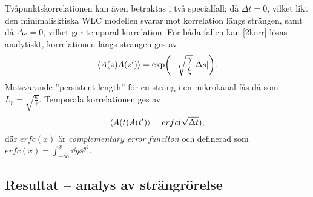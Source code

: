 Tvåpunktskorrelationen kan även betraktas i två specialfall; då $\Delta t=0$, vilket likt den minimalisktiska WLC modellen svarar mot korrelation längs strängen, samt då $\Delta s=0$, vilket ger temporal korrelation. För båda fallen kan \eqref{2korr} lösas analytiskt, korrelationen längs strängen ges av
\begin{equation}
\ev{A(z)A(z')}=\exp(-\sqrt{\frac{\gamma}{\xi}}\abs{\Delta s}).
\end{equation}
Motsvarande ''persistent length'' för en sträng i en mikrokanal fås då som $L_{p}=\sqrt{\frac{\kappa}{\gamma}}$.
Temporala korrelationen ges av
\begin{equation}
    \ev{A(t)A(t')}=erfc(\sqrt{\Delta t}),
\end{equation}
där $erfc(x)$ är \emph{complementary error funciton} och definerad som $erfc(x)=\int_{-\infty}^{x}\dd y\ee^{y^2}$.

\subsection{Resultat -- analys av strängrörelse}




